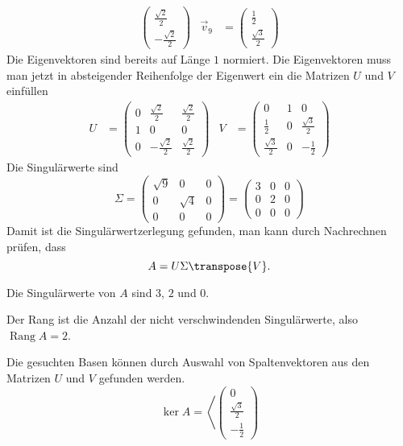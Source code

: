 \begin{loesung}
\begin{align*}
\begin{pmatrix}
\frac{\sqrt{2}}2\\
-\frac{\sqrt{2}}2
\end{pmatrix}
&
\vec{v}_9
&=
\begin{pmatrix}
\frac12\\
\frac{\sqrt{3}}2
\end{pmatrix}
\end{align*}
Die Eigenvektoren sind bereits auf Länge $1$ normiert.
Die Eigenvektoren muss man jetzt in absteigender Reihenfolge der Eigenwert
ein die Matrizen $U$ und $V$ einfüllen
\begin{align*}
U
&=
\begin{pmatrix}
0&\frac{\sqrt{2}}2 & \frac{\sqrt{2}}2 \\
1&        0        &        0         \\
0&-\frac{\sqrt{2}}2 & \frac{\sqrt{2}}2
\end{pmatrix}
&
V
&=
\begin{pmatrix}
   0             & 1 & 0 \\
\frac12          & 0 & \frac{\sqrt{3}}2 \\
\frac{\sqrt{3}}2 & 0 & -\frac{1}{2}
\end{pmatrix}
\end{align*}
Die Singulärwerte sind
\[
\Sigma
=
\begin{pmatrix}
\sqrt{9} &     0    & 0 \\
    0    & \sqrt{4} & 0 \\
    0    &     0    & 0
\end{pmatrix}
=
\begin{pmatrix}
    3    &     0    & 0 \\
    0    &     2    & 0 \\
    0    &     0    & 0
\end{pmatrix}
\]
Damit ist die Singulärwertzerlegung gefunden, man kann durch Nachrechnen
prüfen, dass
\[
A = U\Sigma \transpose{V}.
\]
\begin{teilaufgaben}
\item
Die Singulärwerte von $A$ sind $3$, $2$ und $0$.
\item
Der Rang ist die Anzahl der nicht verschwindenden Singulärwerte, also
$\operatorname{Rang}A=2$.
\item
Die gesuchten Basen können durch Auswahl von Spaltenvektoren aus den 
Matrizen $U$ und $V$ gefunden werden.
\[
\operatorname{ker} A
=
\left\langle
\begin{pmatrix}
0\\ \frac{\sqrt{3}}2 \\ -\frac12

\end{pmatrix}\]
\end{teilaufgaben}
\end{loesung}
